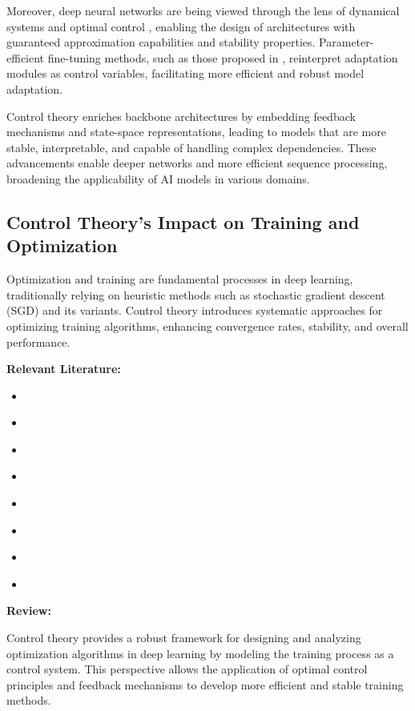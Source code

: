 \documentclass{article}
\theoremstyle{plain}
\theoremstyle{definition}
\theoremstyle{remark}
\begin{document}
Moreover, deep neural networks are being viewed through the lens of dynamical systems and optimal control \cite{liDeepNeuralNetwork2022, liDeepLearningDynamical2022}, enabling the design of architectures with guaranteed approximation capabilities and stability properties. Parameter-efficient fine-tuning methods, such as those proposed in \cite{zhangParameterefficientFinetuningControls}, reinterpret adaptation modules as control variables, facilitating more efficient and robust model adaptation.

Control theory enriches backbone architectures by embedding feedback mechanisms and state-space representations, leading to models that are more stable, interpretable, and capable of handling complex dependencies. These advancements enable deeper networks and more efficient sequence processing, broadening the applicability of AI models in various domains.

\subsection{Control Theory's Impact on Training and Optimization}

Optimization and training are fundamental processes in deep learning, traditionally relying on heuristic methods such as stochastic gradient descent (SGD) and its variants. Control theory introduces systematic approaches for optimizing training algorithms, enhancing convergence rates, stability, and overall performance.

\textbf{Relevant Literature:}
\begin{itemize}
    \item \cite{chenAcceleratedOptimizationDeep2024}
    \item \cite{eMeanfieldOptimalControl2018}
    \item \cite{liOptimalControlApproach2018}
    \item \cite{liMaximumPrincipleBased2018}
    \item \cite{liStochasticModifiedEquations2017}
    \item \cite{renUnifyingBackpropagationForwardforward2024}
    \item \cite{caiOptimizationMachineLearning2020}
    \item \cite{liuDeepLearningTheory2019}
\end{itemize}

\textbf{Review:}

Control theory provides a robust framework for designing and analyzing optimization algorithms in deep learning by modeling the training process as a control system. This perspective allows the application of optimal control principles and feedback mechanisms to develop more efficient and stable training methods.
\end{document}

